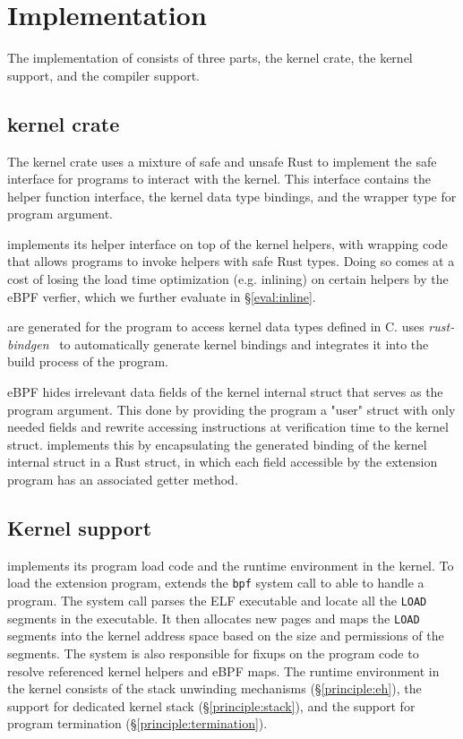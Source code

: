 \section{Implementation}
\label{sec:impl}
The implementation of \projname{} consists of three parts, the \projname{}
    kernel crate, the kernel support, and the compiler support.

\subsection{\projname{} kernel crate}
\label{impl:kernel-crate}
The kernel crate uses a mixture of safe and unsafe Rust to implement the safe
    interface for \projname{} programs to interact with the kernel.
This interface contains the helper function interface, the kernel data type
    bindings, and the wrapper type for program argument.

\projname{} implements its helper interface on top of the kernel helpers, with
    wrapping code that allows programs to invoke helpers with safe Rust types.
Doing so comes at a cost of losing the load time optimization (e.g. inlining) on
    certain helpers by the eBPF verfier, which we further evaluate in
    \S\ref{eval:inline}.

 are generated for the program to access kernel
    data types defined in C.
\projname{} uses \emph{rust-bindgen}~\cite{bindgen} to automatically generate
    kernel bindings and integrates it into the build process of the program.

eBPF hides irrelevant data fields of the kernel internal struct that serves as
    the program argument.
This done by providing the program a "user" struct with only needed fields and
    rewrite accessing instructions at verification time to the kernel struct.
\projname{} implements this by encapsulating the generated binding of the
    kernel internal struct in a Rust struct, in which each field accessible by
    the extension program has an associated getter method.

\subsection{Kernel support}
\label{impl:kernel}
\projname{} implements its program load code and the runtime environment in the
    kernel.
To load the extension program, \projname{} extends the \texttt{bpf} system
    call to able to handle a \projname{} program.
The system call parses the ELF executable and locate all the \texttt{LOAD}
    segments in the executable.
It then allocates new pages and maps the \texttt{LOAD} segments into the kernel
    address space based on the size and permissions of the segments.
The system is also responsible for fixups on the program code to resolve
    referenced kernel helpers and eBPF maps.
The \projname{} runtime environment in the kernel consists of the stack
    unwinding mechanisms (\S\ref{principle:eh}), the support for dedicated
    kernel stack (\S\ref{principle:stack}), and the support for program
    termination (\S\ref{principle:termination}).

